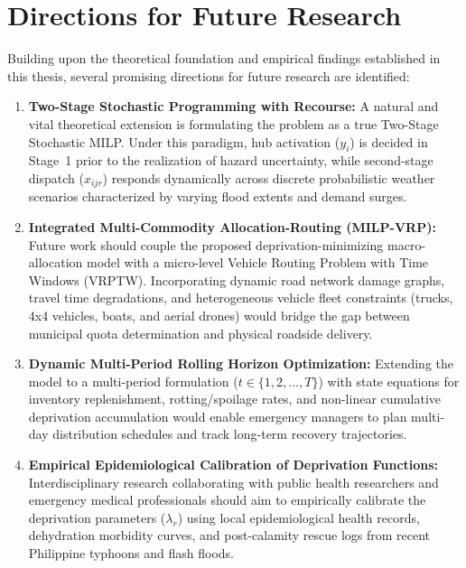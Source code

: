 \section{Directions for Future Research}
\label{sec:future_research}

Building upon the theoretical foundation and empirical findings established in this thesis, several promising directions for future research are identified:

\begin{enumerate}
    \item \textbf{Two-Stage Stochastic Programming with Recourse:}
    A natural and vital theoretical extension is formulating the problem as a true Two-Stage Stochastic MILP. Under this paradigm, hub activation ($y_i$) is decided in Stage~1 prior to the realization of hazard uncertainty, while second-stage dispatch ($x_{ijr}$) responds dynamically across discrete probabilistic weather scenarios characterized by varying flood extents and demand surges.

    \item \textbf{Integrated Multi-Commodity Allocation-Routing (MILP-VRP):}
    Future work should couple the proposed deprivation-minimizing macro-allocation model with a micro-level Vehicle Routing Problem with Time Windows (VRPTW). Incorporating dynamic road network damage graphs, travel time degradations, and heterogeneous vehicle fleet constraints (trucks, 4x4 vehicles, boats, and aerial drones) would bridge the gap between municipal quota determination and physical roadside delivery.

    \item \textbf{Dynamic Multi-Period Rolling Horizon Optimization:}
    Extending the model to a multi-period formulation ($t \in \{1, 2, \dots, T\}$) with state equations for inventory replenishment, rotting/spoilage rates, and non-linear cumulative deprivation accumulation would enable emergency managers to plan multi-day distribution schedules and track long-term recovery trajectories.

    \item \textbf{Empirical Epidemiological Calibration of Deprivation Functions:}
    Interdisciplinary research collaborating with public health researchers and emergency medical professionals should aim to empirically calibrate the deprivation parameters ($\lambda_r$) using local epidemiological health records, dehydration morbidity curves, and post-calamity rescue logs from recent Philippine typhoons and flash floods.


\end{enumerate}
